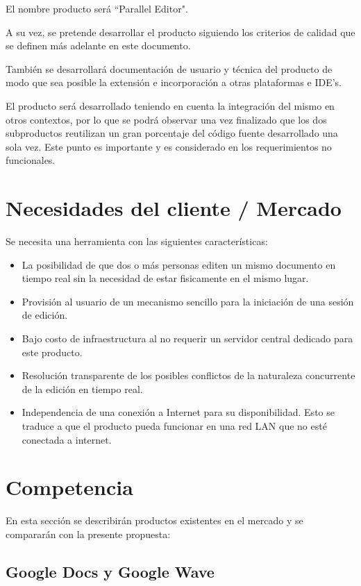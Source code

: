 \documentclass[12pt,a4paper]{article}
\begin{document}
El nombre producto será ``Parallel Editor".

A su vez, se pretende desarrollar el producto siguiendo los criterios de calidad que se definen más adelante en este documento.

También se desarrollará documentación de usuario y técnica del producto de modo que sea posible la extensión e incorporación a otras plataformas e IDE's.

El producto será desarrollado teniendo en cuenta la integración del mismo en otros contextos, por lo que se podrá observar una vez finalizado que los dos subproductos reutilizan un gran porcentaje del código fuente desarrollado una sola vez. Este punto es importante y es considerado en los requerimientos no funcionales.	
	
	\section{Necesidades del cliente / Mercado}
	
	Se necesita una herramienta con las siguientes características:
	\begin{itemize}
		\item La posibilidad de que dos o más personas editen un mismo documento en tiempo real sin la necesidad de estar fisicamente en el mismo lugar.
		\item Provisión al usuario de un mecanismo sencillo para la iniciación de una sesión de edición.
		\item Bajo costo de infraestructura al no requerir un servidor central dedicado para este producto.
		\item Resolución transparente de los posibles conflictos de la naturaleza concurrente de la edición en tiempo real.
		\item Independencia de una conexión a Internet para su disponibilidad. Esto se traduce a que el producto pueda funcionar en una red LAN que no esté conectada a internet.
	\end{itemize}

	\section{Competencia}

En esta sección se describirán productos existentes en el mercado y se compararán con la presente propuesta:

	\subsection{Google Docs y Google Wave}
\end{document}
